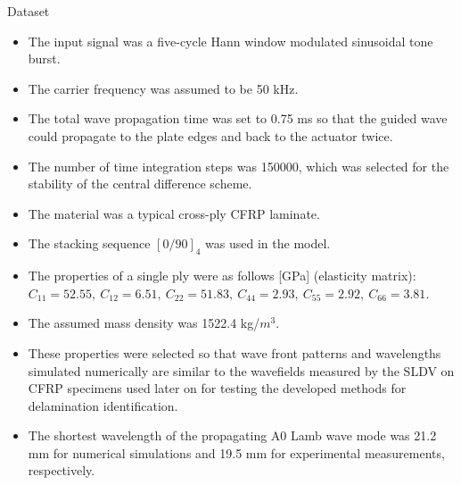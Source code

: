 \documentclass[10pt,aspectratio=169,dvipsnames]{beamer} %
\begin{document}
	\begin{frame}{Dataset}
		\footnotesize	
		\begin{itemize}
			\item The input signal was a five-cycle Hann window modulated sinusoidal tone burst. 
			\item The carrier frequency was assumed to be 50 kHz. 
			\item The total wave propagation time was set to 0.75 ms so that the guided wave could propagate to the plate edges and back to the actuator twice. 
			\item The number of time integration steps was 150000, which was selected for the stability of the central difference scheme.
			\item The material was a typical cross-ply CFRP laminate. 
			\item The stacking sequence \([0/90]_4\) was used in the model. 
			\item The properties of a single ply were as follows [GPa] (elasticity matrix): \(C_{11}=52.55,\ C_{12}=6.51,\ C_{22}=51.83,\ C_{44}=2.93,\ C_{55}=2.92,\ C_{66}=3.81\). 
			\item The assumed mass density was 1522.4 kg/\(m^3\). 
			\item These properties were selected so that wave front patterns and wavelengths simulated numerically are similar to the wavefields measured by the SLDV on CFRP specimens used later on for testing the developed methods for delamination identification. 
			\item The shortest wavelength of the propagating A0 Lamb wave mode was 21.2 mm for numerical simulations and 19.5 mm for experimental measurements, respectively.
		\end{itemize}		
	\end{frame}
\end{document}
